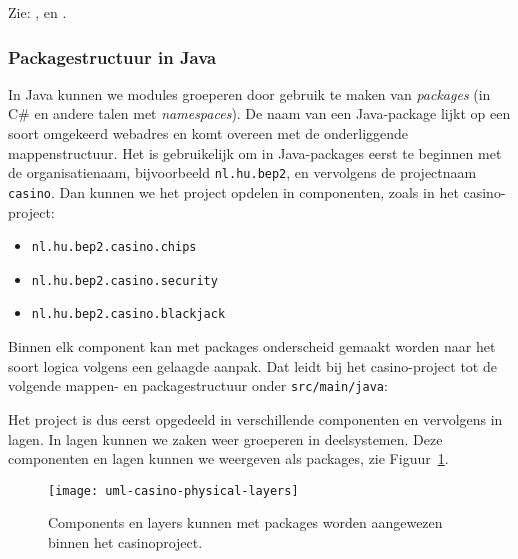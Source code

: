 Zie: \cite{YourdonConstantine1979}, \cite{Dijkstra1982} en \cite{ISO25010}.

\newpage
\subsubsection{Packagestructuur in Java}
In Java kunnen we modules groeperen door gebruik te maken van 
\emph{packages} (in C\# en andere talen met \emph{namespaces}).
De naam van een Java-package lijkt op een soort omgekeerd webadres
en komt overeen met de onderliggende mappenstructuur.
Het is gebruikelijk om in Java-packages eerst te beginnen met de organisatienaam,
bijvoorbeeld \texttt{nl.hu.bep2}, en vervolgens de projectnaam \texttt{casino}.
Dan kunnen we het project opdelen in componenten, zoals in het casino-project: 
\begin{itemize}
\item \texttt{nl.hu.bep2.casino.chips}
\item \texttt{nl.hu.bep2.casino.security}
\item \texttt{nl.hu.bep2.casino.blackjack}
\end{itemize}

Binnen elk component kan met packages 
onderscheid gemaakt worden naar het soort logica volgens een gelaagde aanpak. 
Dat leidt bij het casino-project tot de volgende 
mappen- en packagestructuur onder \texttt{src/main/java}:


Het project is dus eerst opgedeeld in verschillende componenten en vervolgens in 
lagen. In lagen kunnen we zaken weer groeperen in deelsystemen. Deze componenten 
en lagen kunnen we weergeven als packages, zie Figuur~\ref{fig:uml-casino-physical-layers}.

\begin{figure}[H]
    \centering
    \texttt{[image: uml-casino-physical-layers]}
    \caption{Components en layers kunnen met packages worden aangewezen binnen het casinoproject.}
    \label{fig:uml-casino-physical-layers}
\end{figure}

